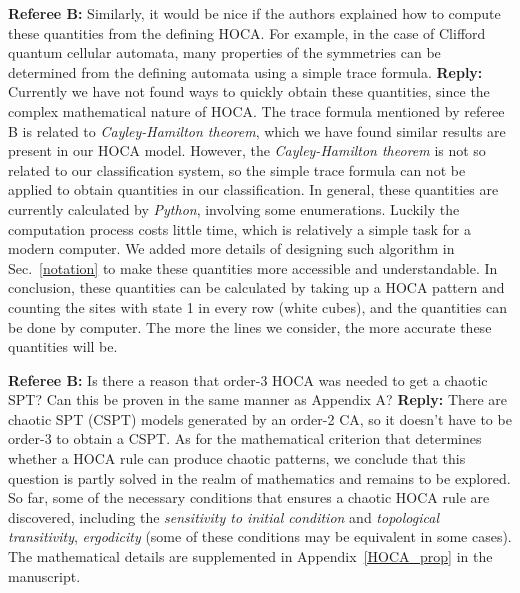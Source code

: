 \documentclass{article}
\begin{document}
\begin{tcolorbox}[title=Reply 8B (point-to-point reply),breakable]
\textbf{Referee B:}  Similarly, it would be nice if the authors explained how to compute
these quantities from the defining HOCA. For example, in the case of
Clifford quantum cellular automata, many properties of the symmetries
can be determined from the defining automata using a simple trace
formula.
\tcblower
\textbf{Reply:} Currently we have not found ways to quickly obtain these quantities, since the complex mathematical nature of HOCA. The trace formula mentioned by referee B is related to \textit{Cayley-Hamilton theorem}, which we have found similar results are present in our HOCA model. However, the \textit{Cayley-Hamilton theorem} is not so related to our classification system, so the simple trace formula can not be applied to obtain quantities in our classification. In general, these quantities are currently calculated by \textit{Python}, involving some enumerations. Luckily the computation process costs little time, which is relatively a simple task for a modern computer. We added more details of designing such algorithm in Sec.~\ref{notation} to make these quantities more accessible and understandable. In conclusion, these quantities can be calculated by taking up a HOCA pattern and counting the sites with state 1 in every row (white cubes), and the quantities can be done by computer. The more the lines we consider, the more accurate these quantities will be.
\end{tcolorbox}

\begin{tcolorbox}[title=Reply 9 (point-to-point reply)]
\textbf{Referee B:}  Is there a reason that order-3 HOCA was needed to get a chaotic SPT? Can this be proven in the same manner as Appendix A?
\tcblower
\textbf{Reply:} There are chaotic SPT (CSPT) models generated by an order-2 CA, so it doesn't have to be order-3 to obtain a CSPT. As for the mathematical criterion that determines whether a HOCA rule can produce chaotic patterns, we conclude that this question is partly solved in the realm of mathematics and remains to be explored. So far, some of the necessary conditions that ensures a chaotic HOCA rule are discovered, including the \textit{sensitivity to initial condition} and \textit{topological transitivity}, \textit{ergodicity} (some of these conditions may be equivalent in some cases). The mathematical details are supplemented in Appendix~\ref{HOCA_prop} in the manuscript.
\end{tcolorbox}
\end{document}
